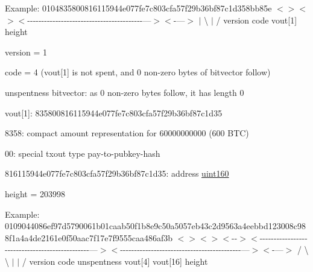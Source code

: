 Example\+: 0104835800816115944e077fe7c803cfa57f29b36bf87c1d358bb85e $<$$>$$<$$>$$<$-\/-\/-\/-\/-\/-\/-\/-\/-\/-\/-\/-\/-\/-\/-\/-\/-\/-\/-\/-\/-\/-\/-\/-\/-\/-\/-\/-\/-\/-\/-\/-\/-\/-\/-\/-\/-\/-\/-\/-\/-\/---$>$$<$-\/---$>$ $\vert$ \textbackslash{} $\vert$ / version code vout\mbox{[}1\mbox{]} height


\begin{DoxyItemize}
\item version = 1
\item code = 4 (vout\mbox{[}1\mbox{]} is not spent, and 0 non-\/zero bytes of bitvector follow)
\item unspentness bitvector\+: as 0 non-\/zero bytes follow, it has length 0
\item vout\mbox{[}1\mbox{]}\+: 835800816115944e077fe7c803cfa57f29b36bf87c1d35
\begin{DoxyItemize}
\item 8358\+: compact amount representation for 60000000000 (600 B\+TC)
\item 00\+: special txout type pay-\/to-\/pubkey-\/hash
\item 816115944e077fe7c803cfa57f29b36bf87c1d35\+: address \mbox{\hyperlink{classuint160}{uint160}}
\end{DoxyItemize}
\item height = 203998
\end{DoxyItemize}

Example\+: 0109044086ef97d5790061b01caab50f1b8e9c50a5057eb43c2d9563a4eebbd123008c988f1a4a4de2161e0f50aac7f17e7f9555caa486af3b $<$$>$$<$$>$$<$-\/-\/$>$$<$-\/-\/-\/-\/-\/-\/-\/-\/-\/-\/-\/-\/-\/-\/-\/-\/-\/-\/-\/-\/-\/-\/-\/-\/-\/-\/-\/-\/-\/-\/-\/-\/-\/-\/-\/-\/-\/-\/-\/-\/-\/-\/-\/-\/-\/-\/-\/---$>$$<$-\/-\/-\/-\/-\/-\/-\/-\/-\/-\/-\/-\/-\/-\/-\/-\/-\/-\/-\/-\/-\/-\/-\/-\/-\/-\/-\/-\/-\/-\/-\/-\/-\/-\/-\/-\/-\/-\/-\/-\/-\/-\/-\/---$>$$<$-\/---$>$ / \textbackslash{} \textbackslash{} $\vert$ $\vert$ / version code unspentness vout\mbox{[}4\mbox{]} vout\mbox{[}16\mbox{]} height


